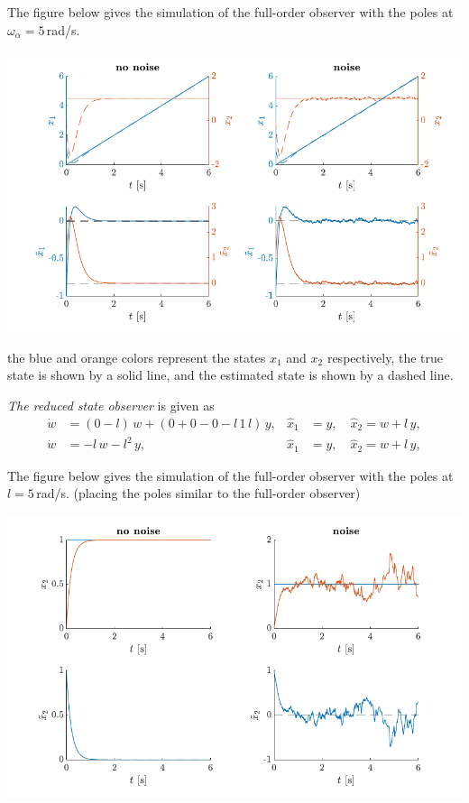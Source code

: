 The figure below gives the simulation of the full-order observer with the poles at $\omega_\alpha = 5$\,rad/s. 

\includegraphics{figures/ex6_p1.pdf}

the blue and orange colors represent the states $x_1$ and $x_2$ respectively, the true state is shown by a solid line, and the estimated state is shown by a dashed line. 

\emph{The reduced state observer} is given as 
\begin{align*}
    \dot w &= \left(0 - l\right)\,w + \left(0 + 0 - 0 - l\,1\,l\right)\,y, & \hat x_1 &= y, \quad \hat x_2 = w + l\,y, \\
    \dot w &= -l\,w - l^2\,y, & \hat x_1 &= y, \quad \hat x_2 = w + l\,y, 
\end{align*}

The figure below gives the simulation of the full-order observer with the poles at $l = 5$\,rad/s. (placing the poles similar to the full-order observer)

\includegraphics{figures/ex6_p2.pdf}

